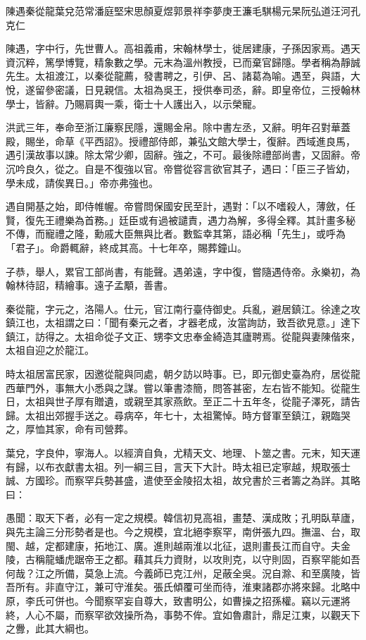 
\begin{pinyinscope}
陳遇秦從龍葉兌范常潘庭堅宋思顏夏煜郭景祥李夢庚王濂毛騏楊元杲阮弘道汪河孔克仁

陳遇，字中行，先世曹人。高祖義甫，宋翰林學士，徙居建康，子孫因家焉。遇天資沉粹，篤學博覽，精象數之學。元末為溫州教授，已而棄官歸隱。學者稱為靜誠先生。太祖渡江，以秦從龍薦，發書聘之，引伊、呂、諸葛為喻。遇至，與語，大悅，遂留參密議，日見親信。太祖為吳王，授供奉司丞，辭。即皇帝位，三授翰林學士，皆辭。乃賜肩輿一乘，衛士十人護出入，以示榮寵。

洪武三年，奉命至浙江廉察民隱，還賜金帛。除中書左丞，又辭。明年召對華蓋殿，賜坐，命草《平西詔》。授禮部侍郎，兼弘文館大學士，復辭。西域進良馬，遇引漢故事以諫。除太常少卿，固辭。強之，不可。最後除禮部尚書，又固辭。帝沉吟良久，從之。自是不復強以官。帝嘗從容言欲官其子，遇曰：「臣三子皆幼，學未成，請俟異日。」帝亦弗強也。

遇自開基之始，即侍帷幄。帝嘗問保國安民至計，遇對：「以不嗜殺人，薄斂，任賢，復先王禮樂為首務。」廷臣或有過被譴責，遇力為解，多得全釋。其計畫多秘不傳，而寵禮之隆，勳戚大臣無與比者。數監幸其第，語必稱「先生」，或呼為「君子」。命爵輒辭，終成其高。十七年卒，賜葬鐘山。

子恭，舉人，累官工部尚書，有能聲。遇弟遠，字中復，嘗隨遇侍帝。永樂初，為翰林待詔，精繪事。遠子孟顒，善書。

秦從龍，字元之，洛陽人。仕元，官江南行臺侍御史。兵亂，避居鎮江。徐達之攻鎮江也，太祖謂之曰：「聞有秦元之者，才器老成，汝當詢訪，致吾欲見意。」達下鎮江，訪得之。太祖命從子文正、甥李文忠奉金綺造其廬聘焉。從龍與妻陳偕來，太祖自迎之於龍江。

時太祖居富民家，因邀從龍與同處，朝夕訪以時事。已，即元御史臺為府，居從龍西華門外，事無大小悉與之謀。嘗以筆書漆簡，問答甚密，左右皆不能知。從龍生日，太祖與世子厚有贈遺，或親至其家燕飲。至正二十五年冬，從龍子澤死，請告歸。太祖出郊握手送之。尋病卒，年七十，太祖驚悼。時方督軍至鎮江，親臨哭之，厚恤其家，命有司營葬。

葉兌，字良仲，寧海人。以經濟自負，尤精天文、地理、卜筮之書。元末，知天運有歸，以布衣獻書太祖。列一綱三目，言天下大計。時太祖已定寧越，規取張士誠、方國珍。而察罕兵勢甚盛，遣使至金陵招太祖，故兌書於三者籌之為詳。其略曰：

愚聞：取天下者，必有一定之規模。韓信初見高祖，畫楚、漢成敗；孔明臥草廬，與先主論三分形勢者是也。今之規模，宜北絕李察罕，南併張九四。撫溫、台，取閩、越，定都建康，拓地江、廣。進則越兩淮以北征，退則畫長江而自守。夫金陵，古稱龍蟠虎踞帝王之都。藉其兵力資財，以攻則克，以守則固，百察罕能如吾何哉？江之所備，莫急上流。今義師已克江州，足蔽全吳。況自滁、和至廣陵，皆吾所有。非直守江，兼可守淮矣。張氏傾覆可坐而待，淮東諸郡亦將來歸。北略中原，李氏可併也。今聞察罕妄自尊大，致書明公，如曹操之招孫權。竊以元運將終，人心不屬，而察罕欲效操所為，事勢不侔。宜如魯肅計，鼎足江東，以觀天下之釁，此其大綱也。


\end{pinyinscope}
